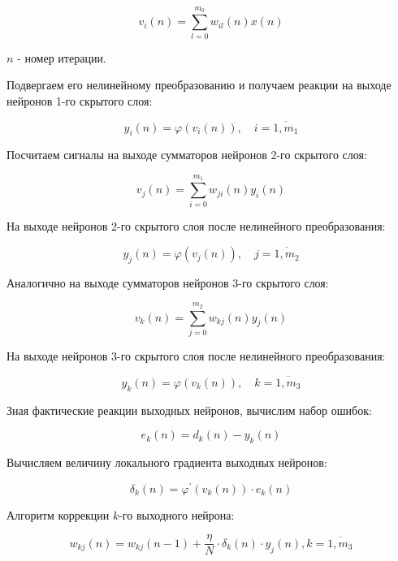 \documentclass[a4paper]{article}
\numberwithin{equation}{subsection}
\begin{document}
\begin{equation}
    v_i (n) = \sum_{l=0}^{m_{0}} w_{il}(n) x(n)
\end{equation}

\noindent
$n$ - номер итерации.

Подвергаем его нелинейному преобразованию и получаем реакции на выходе нейронов 1-го скрытого слоя:

\begin{equation}
    y_i(n) = \varphi (v_i(n)), \quad i=\overline{1,m_1}
\end{equation}

Посчитаем сигналы на выходе сумматоров нейронов 2-го скрытого слоя:

\begin{equation}
    v_j (n) = \sum_{i=0}^{m_{1}} w_{ji}(n) y_i(n)
\end{equation}

На выходе нейронов 2-го скрытого слоя после нелинейного преобразования:

\begin{equation}
    y_j(n) = \varphi (v_j(n)), \quad j=\overline{1,m_2}
\end{equation}

Аналогично на выходе сумматоров нейронов 3-го скрытого слоя:

\begin{equation}
    v_k (n) = \sum_{j=0}^{m_{2}} w_{kj}(n) y_j(n)
\end{equation}

На выходе нейронов 3-го скрытого слоя после нелинейного преобразования:

\begin{equation}
    y_k(n) = \varphi (v_k(n)), \quad k=\overline{1,m_3}
\end{equation}

Зная фактические реакции выходных нейронов, вычислим набор ошибок:

\begin{equation}
    e_{k}(n) = d_k(n) - y_k(n)
\end{equation}

Вычисляем величину локального градиента выходных нейронов:

\begin{equation}
    \delta_k(n) = \varphi^{\prime}(v_k(n))\cdot e_k(n)
\end{equation}

Алгоритм коррекции $k$-го выходного нейрона:

\begin{equation}
    w_{kj}(n) = w_{kj}(n-1) + \dfrac{\eta}{N} \cdot \delta_{k}(n) \cdot y_j(n), k=\overline{1,m_3}
\end{equation}
\end{document}
